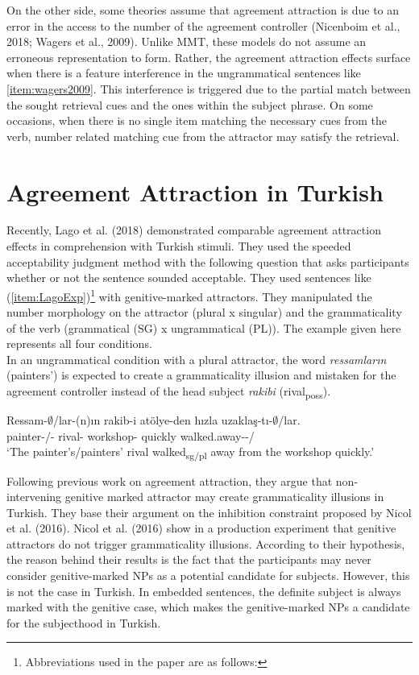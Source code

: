 \documentclass[
  english,
  doc,floatsintext]{apa6}
\begin{document}
On the other side, some theories assume that agreement attraction is due to an error in the access to the number of the agreement controller (Nicenboim et al., 2018; Wagers et al., 2009). Unlike MMT, these models do not assume an erroneous representation to form. Rather, the agreement attraction effects surface when there is a feature interference in the ungrammatical sentences like \ref{item:wagers2009}. This interference is triggered due to the partial match between the sought retrieval cues and the ones within the subject phrase. On some occasions, when there is no single item matching the necessary cues from the verb, number related matching cue from the attractor may satisfy the retrieval.

\hypertarget{agreement-attraction-in-turkish}{%
\section{Agreement Attraction in Turkish}\label{agreement-attraction-in-turkish}}

Recently, Lago et al. (2018) demonstrated comparable agreement attraction effects in comprehension with Turkish stimuli.
They used the speeded acceptability judgment method with the following question that asks participants whether or not the sentence sounded acceptable.
They used sentences like (\ref{item:LagoExp})\footnote{Abbreviations used in the paper are as follows: \printglossaries} with genitive-marked attractors.
They manipulated the number morphology on the attractor (plural x singular) and the grammaticality of the verb (grammatical (SG) x ungrammatical (PL)). The example given here represents all four conditions.\\
In an ungrammatical condition with a plural attractor, the word \emph{ressamların} (painters') is expected to create a grammaticality illusion and mistaken for the agreement controller instead of the head subject \emph{rakibi} (rival\textsubscript{poss}).

\begin{exe}
\ex \label{item:LagoExp}
\gll Ressam-$\emptyset$/lar-(n){\i}n rakib-i at\"{o}lye-den h{\i}zla uzakla\c{s}-t{\i}-$\emptyset$/lar.\\
painter-\Sg{}/\Pl{}-\Gen{} rival-\Poss{} workshop-\Abl{} quickly walked.away-\Pst{}-\Sg{}/\Pl{}\\
\glt `The painter's/painters' rival walked\textsubscript{sg/pl} away from the workshop quickly.'
\end{exe}

Following previous work on agreement attraction, they
argue
that non-intervening genitive marked attractor may create grammaticality illusions in Turkish. They base their argument on the inhibition constraint proposed by Nicol et al. (2016). Nicol et al. (2016) show in a production experiment that genitive attractors do not trigger grammaticality illusions. According to their hypothesis, the reason behind their results is the fact that the participants may never consider genitive-marked NPs as a potential candidate for subjects.
However, this is not the case in Turkish. In embedded sentences, the definite subject is always marked with the genitive case, which makes the genitive-marked NPs a candidate for the subjecthood in Turkish.
\end{document}
